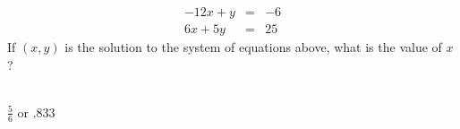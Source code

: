  
\begin{eqnarray*}
-12x+y&=&-6\\
6x+5y&=&25
\end{eqnarray*}
If $(x,y)$ is the solution to the system of equations above, what is the value of $x$?\\\\


\ifsat
	\begin{enumerate}[label=\Alph*)]
	\end{enumerate}
\else
\fi

\ifacteven
	\begin{enumerate}[label=\textbf{\Alph*.},itemsep=\fill,align=left]
	\end{enumerate}
\else
\fi

\ifactodd
	\begin{enumerate}[label=\textbf{\Alph*.},itemsep=\fill,align=left]
	\end{enumerate}
\else
\fi

\ifgridin
$\frac{5}{6}$ or $.833$
\else
\fi

